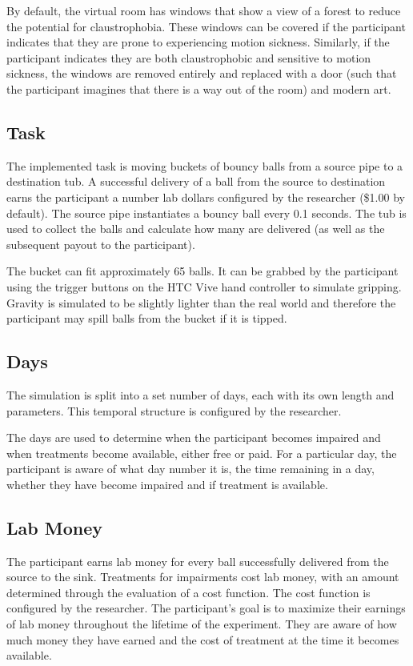 \documentclass{article}
\begin{document}
By default, the virtual room has windows that show a view of a forest to reduce the potential for claustrophobia. These windows can be covered if the participant indicates that they are prone to experiencing motion sickness. Similarly, if the participant indicates they are both claustrophobic and sensitive to motion sickness, the windows are removed entirely and replaced with a door (such that the participant imagines that there is a way out of the room) and modern art. 


\subsection{Task}

The implemented task is moving buckets of bouncy balls from a source pipe to a destination tub. A successful delivery of a ball from the source to destination earns the participant a number lab dollars configured by the researcher (\$1.00 by default). The source pipe instantiates a bouncy ball every 0.1 seconds. The tub is used to collect the balls and calculate how many are delivered (as well as the subsequent payout to the participant).

The bucket can fit approximately 65 balls. It can be grabbed by the participant using the trigger buttons on the HTC Vive hand controller to simulate gripping. Gravity is simulated to be slightly lighter than the real world and therefore the participant may spill balls from the bucket if it is tipped.


\subsection{Days}

The simulation is split into a set number of days, each with its own length and parameters. This temporal structure is configured by the researcher.

The days are used to determine when the participant becomes impaired and when treatments become available, either free or paid. For a particular day, the participant is aware of what day number it is, the time remaining in a day, whether they have become impaired and if treatment is available.

\subsection{Lab Money}

The participant earns lab money for every ball successfully delivered from the source to the sink. Treatments for impairments cost lab money, with an amount determined through the evaluation of a cost function. The cost function is configured by the researcher. The participant’s goal is to maximize their earnings of lab money throughout the lifetime of the experiment. They are aware of how much money they have earned and the cost of treatment at the time it becomes available.
\end{document}
